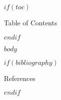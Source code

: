 \documentclass[fontset=fandol,envcountsect]{ctexbeamer}
\title$if(shorttitle)$[$shorttitle$]$endif${$title$$if(thanks)$\thanks{$thanks$}$endif$}
\subtitle$if(shortsubtitle)$[$shortsubtitle$]$endif${$subtitle$}
\author$if(shortauthor)$[$shortauthor$]$endif${$for(author)$$author$$sep$ \and $endfor$}
\date$if(shortdate)$[$shortdate$]$endif${$date$$if(date-modified)$\thanks{\transmodified \space $date-modified$.}$endif$}
\institute$if(shortinstitute)$[$shortinstitute$]$endif${$for(institute)$$institute$$sep$ \and $endfor$}
\def\transtoc{目录}
\def\transreferences{参考文献}
\def\transtoc{Table of Contents}
\def\transreferences{References}
\theoremstyle{theorem}
\theoremstyle{example}
\theoremstyle{remark}
\theoremstyle{theorem}
\theoremstyle{example}
\theoremstyle{remark}
\begin{document}
\frame{\titlepage}

$if(toc)$
\begin{frame}{\transtoc}
  \tableofcontents
\end{frame}
$endif$

$body$

$if(bibliography)$
\begin{frame}[allowframebreaks]{\transreferences}
  \ifzh
    \printbibliography[heading=none, title={参考文献}]
  \else
    \printbibliography[heading=none]
  \fi
\end{frame}
$endif$
\end{document}
